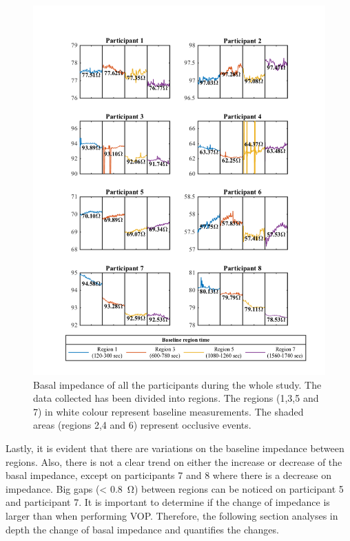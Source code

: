 \begin{figure}[!htbp]  %
	\includegraphics[width=\textwidth,keepaspectratio]{figure_b_3}    
	\caption[Measurements of the basal impedance during the whole study]{Basal impedance of all the participants during the whole study. The data collected has been divided into regions. The regions (1,3,5 and 7) in white colour represent baseline measurements. The shaded areas (regions 2,4 and 6) represent occlusive events.  }
	\label{fig:Basal Regions} 
\end{figure}

Lastly, it is evident that there are variations on the baseline impedance between regions. Also, there is not a clear trend on either the increase or decrease of the basal impedance, except on participants 7 and 8 where there is a decrease on impedance. Big gaps (< \SI{0.8}{\ohm}) between regions can be noticed on participant 5 and participant 7. It is important to determine if the change of impedance is larger than when performing VOP. Therefore, the following section analyses in depth the change of basal impedance and quantifies the changes. 


